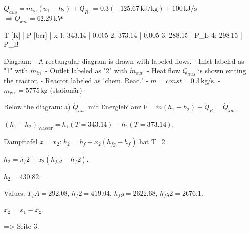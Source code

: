 \( \dot{Q}_{aus} = \dot{m}_{in} (u_1 - h_2) + \dot{Q}_R \)  
\( = 0.3 (-125.67 \, \text{kJ/kg}) + 100 \, \text{kJ/s} \)  
\( \Rightarrow \dot{Q}_{aus} = 62.29 \, \text{kW} \)

T [K] | P [bar] | x  
1: 343.14 | 0.005  
2: 373.14 | 0.005  
3: 288.15 | P_B  
4: 298.15 | P_B  

Diagram:  
- A rectangular diagram is drawn with labeled flows.  
  - Inlet labeled as "1" with \( \dot{m}_{in} \).  
  - Outlet labeled as "2" with \( \dot{m}_{out} \).  
  - Heat flow \( \dot{Q}_{aus} \) is shown exiting the reactor.  
  - Reactor labeled as "chem. Reac."  
  - \( \dot{m} = const = 0.3 \, \text{kg/s} \).  
  - \( m_{\text{ges}} = 5775 \, \text{kg} \) (stationär).  

Below the diagram:  
a) \( \dot{Q}_{aus} \) mit Energiebilanz  
\( 0 = \dot{m} (h_1 - h_2) + \dot{Q}_R = \dot{Q}_{aus} \).  

\( (h_1 - h_2)_{\text{Wasser}} = h_1 (T = 343.14) - h_2 (T = 373.14) \).  

Dampftafel \( x = x_2 \):  
\( h_2 = h_f + x_2 (h_{fg} - h_f) \) hat T_2.  

\( h_2 = h_f2 + x_2 (h_{fg2} - h_f2) \).  

\( h_2 = 430.82 \).  

Values:  
\( T_fA = 292.08 \), \( h_f2 = 419.04 \), \( h_fg = 2622.68 \), \( h_fg2 = 2676.1 \).  

\( x_2 = x_1 - x_2 \).  

=> Seite 3.
